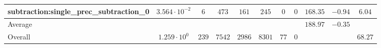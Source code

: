 \begin{tabular}{|l|c|c|c|c|c|c|c|c|c|c|}
subtraction:single\_prec\_subtraction\_0         & $ 3.564 \cdot 10^{-2} $ & $ 6      $ & $ 473  $ & $ 161  $ & $ 245   $ & $ 0  $ & $ 0 $ & $ 168.35      $ & $ -0.94   $ & $ 6.04    $ \\
\hline
Average                                          & $                     $ & $        $ & $      $ & $      $ & $       $ & $    $ & $   $ & $ 188.97      $ & $ -0.35   $ & $         $ \\
\hline
Overall                                          & $ 1.259 \cdot 10^{0}  $ & $ 239    $ & $ 7542 $ & $ 2986 $ & $ 8301  $ & $ 77 $ & $ 0 $ & $             $ & $         $ & $ 68.27   $ \\
\hline
\end{tabular}
